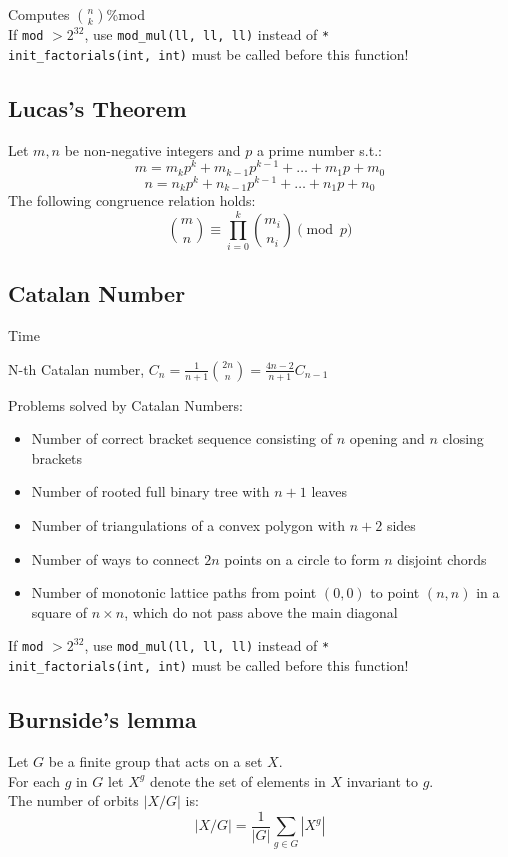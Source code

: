 Computes $\binom{n}{k}$\:\%\:mod \\
If \verb|mod| $> 2^{32}$, use \verb|mod_mul(ll, ll, ll)| instead of \verb|*| \\
\verb|init_factorials(int, int)| must be called before this function!



\subsection{Lucas's Theorem}
Let $m, n$ be non-negative integers and $p$ a prime number s.t.: \\
\[m = m_k p^k + m_{k-1} p^{k-1} + \ldots + m_1 p + m_0\]
\[n = n_k p^k + n_{k-1} p^{k-1} + \ldots + n_1 p + n_0\]
The following congruence relation holds:
\[\binom{m}{n} \equiv \prod_{i=0}^k\binom{m_i}{n_i} \pmod{p}\]


\subsection{Catalan Number}
 Time

N-th Catalan number, $C_n = \frac{1}{n+1}\binom{2n}{n} = \frac{4n-2}{n+1}C_{n-1}$

Problems solved by Catalan Numbers:
\begin{itemize}
	\item Number of correct bracket sequence consisting of $n$ opening and $n$ closing brackets
	\item Number of rooted full binary tree with $n + 1$ leaves
	\item Number of triangulations of a convex polygon with $n + 2$ sides
	\item Number of ways to connect $2n$ points on a circle to form $n$ disjoint chords
	\item Number of monotonic lattice paths from point $(0, 0)$ to point $(n, n)$ in a square of $n \times n$, which do not pass above the main diagonal
\end{itemize}

If \verb|mod| $> 2^{32}$, use \verb|mod_mul(ll, ll, ll)| instead of \verb|*| \\
\verb|init_factorials(int, int)| must be called before this function!



\subsection{Burnside's lemma}
Let $G$ be a finite group that acts on a set $X$. \\
For each $g$ in $G$ let $X^g$ denote the set of elements in $X$ invariant to $g$. \\
The number of orbits $|X / G|$ is:
\[|X / G| = \frac{1}{|G|} \sum_{g \in G}|X^g|\]

